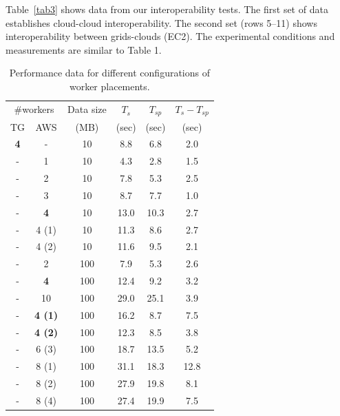 \documentclass[3p,twocolumn]{elsarticle}
\begin{document}
Table~\ref{tab3} shows data from our interoperability tests.  The
first set of data establishes cloud-cloud interoperability. The second
set (rows 5--11) shows interoperability between grids-clouds (EC2).
The experimental conditions and measurements are similar to Table 1.

\begin{table}[h!]
  \footnotesize
  \begin{tabular}{cccccc}
    \hline
    \multicolumn{2}{c}{\#workers}  &  Data size   &  $T_s$  & $T_{sp}$ & $T_s - T_{sp}$\\
    TG &  AWS &   (MB)  & (sec) & (sec)  & (sec) \\
    \hline
    { {\bf 4}} & - & 10  &  8.8 &  6.8 & 2.0 \\
    \hline
    - & 1 & 10 & 4.3 & 2.8 & 1.5 \\
    - & 2 & 10 & 7.8 & 5.3 & 2.5 \\
    - & 3 & 10 & 8.7 & 7.7 & 1.0 \\
    - & {\bf 4} & 10 & 13.0 & 10.3 & 2.7 \\
    - & 4 (1) & 10 & 11.3 & 8.6 & 2.7 \\
    - & 4 (2) & 10 & 11.6 & 9.5 & 2.1 \\
    \hline
    -  & 2  & 100 & 7.9  & 5.3 & 2.6 \\
    -  & {\bf 4}  & 100 & 12.4 & 9.2 & 3.2\\
    -  & 10 & 100 & 29.0 & 25.1 & 3.9 \\
    \hline
    - & {\bf 4 (1)} & 100 & 16.2 & 8.7 & 7.5 \\
    - & {\bf 4 (2)} & 100 & 12.3 & 8.5 & 3.8 \\
    - & 6 (3) & 100 & 18.7 & 13.5 & 5.2\\
    - & 8 (1) & 100 & 31.1 & 18.3 & 12.8 \\
    - & 8 (2) & 100 & 27.9 & 19.8 & 8.1\\
    - & 8 (4) & 100 & 27.4 & 19.9 & 7.5\\
    \hline \hline
  \end{tabular}
  \caption{Performance data for different configurations of worker
  placements.
  \label{tab:1a}}
\end{table}
\end{document}
